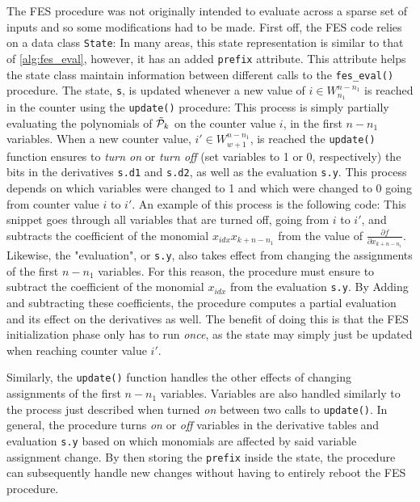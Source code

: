 The FES procedure was not originally intended to evaluate across a sparse set of inputs and so some modifications had to be made. First off, the FES code relies on a data class \texttt{State}:
In many areas, this state representation is similar to that of \cref{alg:fes_eval}, however, it has an added \texttt{prefix} attribute. This attribute helps the state class maintain information between different calls to the \texttt{fes\_eval()} procedure. The state, \texttt{s}, is updated whenever a new value of $i \in W^{n - n_1}_{n_1}$ is reached in the counter using the \texttt{update()} procedure:
This process is simply partially evaluating the polynomials of $\Tilde{\mathcal{P}}_k$ on the counter value $i$, in the first $n - n_1$ variables. When a new counter value, $i' \in W^{n - n_1}_{w + 1}$, is reached the \texttt{update()} function ensures to \textit{turn on} or \textit{turn off} (set variables to 1 or 0, respectively) the bits in the derivatives \texttt{s.d1} and \texttt{s.d2}, as well as the evaluation \texttt{s.y}. This process depends on which variables were changed to 1 and which were changed to 0 going from counter value $i$ to $i'$. An example of this process is the following code:
This snippet goes through all variables that are turned off, going from $i$ to $i'$, and subtracts the coefficient of the monomial $x_{idx}x_{k + n - n_1}$ from the value of $\frac{\partial f}{\partial x_{k + n - n_1}}$. Likewise, the "evaluation", or \texttt{s.y}, also takes effect from changing the assignments of the first $n - n_1$ variables. For this reason, the procedure must ensure to subtract the coefficient of the monomial $x_{idx}$ from the evaluation \texttt{s.y}. By Adding and subtracting these coefficients, the procedure computes a partial evaluation and its effect on the derivatives as well. The benefit of doing this is that the FES initialization phase only has to run \textit{once}, as the state may simply just be updated when reaching counter value $i'$.

Similarly, the \texttt{update()} function handles the other effects of changing assignments of the first $n - n_1$ variables. Variables are also handled similarly to the process just described when turned \textit{on} between two calls to \texttt{update()}. In general, the procedure turns \textit{on} or \textit{off} variables in the derivative tables and evaluation \texttt{s.y} based on which monomials are affected by said variable assignment change. By then storing the \texttt{prefix} inside the state, the procedure can subsequently handle new changes without having to entirely reboot the FES procedure.

